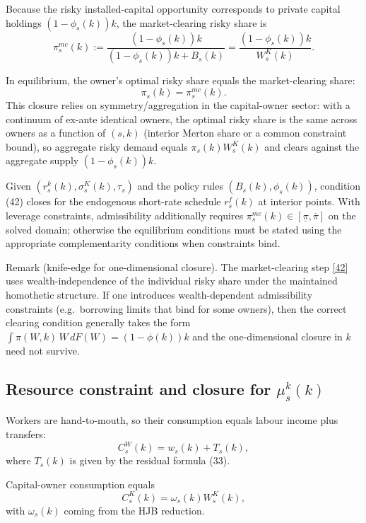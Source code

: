 \documentclass{article}
\begin{document}
Because the risky installed-capital opportunity corresponds to private capital holdings $(1-\phi_s(k))k$, the market-clearing risky share is
\begin{equation}
\pi^{mc}_s(k)
:=
\frac{(1-\phi_s(k))k}{(1-\phi_s(k))k+B_s(k)}
=
\frac{(1-\phi_s(k))k}{W^K_s(k)}.
\tag{41}
\end{equation}

In equilibrium, the owner’s optimal risky share equals the market-clearing share:
\begin{equation}
\pi_s(k)=\pi^{mc}_s(k).
\tag{42}
\end{equation}
This closure relies on symmetry/aggregation in the capital-owner sector: with a continuum of ex-ante identical owners, the optimal risky share is the same across owners as a function of $(s,k)$ (interior Merton share or a common constraint bound), so aggregate risky demand equals $\pi_s(k)W^K_s(k)$ and clears against the aggregate supply $(1-\phi_s(k))k$.

Given $(r^k_s(k),\sigma^K_s(k),\tau_s)$ and the policy rules $(B_s(k),\phi_s(k))$, condition (42) closes for the endogenous short-rate schedule $r^f_s(k)$ at interior points. With leverage constraints, admissibility additionally requires $\pi^{mc}_s(k)\in[\underline{\pi},\overline{\pi}]$ on the solved domain; otherwise the equilibrium conditions must be stated using the appropriate complementarity conditions when constraints bind.

Remark (knife-edge for one-dimensional closure). The market-clearing step \eqref{42} uses wealth-independence of the individual risky share under the maintained homothetic structure. If one introduces wealth-dependent admissibility constraints (e.g.\ borrowing limits that bind for some owners), then the correct clearing condition generally takes the form $\int \pi(W,k)\,W\,dF(W) = (1-\phi(k))k$ and the one-dimensional closure in $k$ need not survive.

\subsection{Resource constraint and closure for $\mu^k_s(k)$}
Workers are hand-to-mouth, so their consumption equals labour income plus transfers:
\begin{equation}
C^W_s(k)=w_s(k)+T_s(k),
\tag{43}
\end{equation}
where $T_s(k)$ is given by the residual formula (33).

Capital-owner consumption equals
\begin{equation}
C^K_s(k)=\omega_s(k)W^K_s(k),
\tag{44}
\end{equation}
with $\omega_s(k)$ coming from the HJB reduction.
\end{document}
